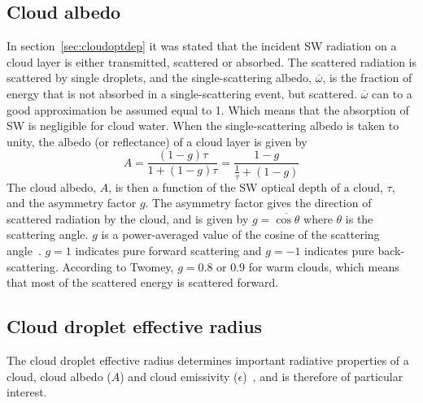 \subsection{Cloud albedo}
In section~\ref{sec:cloudoptdep} it was stated that the incident SW radiation on a cloud layer is either transmitted, scattered or absorbed. The scattered radiation is scattered by single droplets, and the single-scattering albedo, $\overline{\omega}$, is the fraction of energy that is not absorbed in a single-scattering event, but scattered. $\overline{\omega}$ can to a good approximation be assumed equal to 1. Which means that the absorption of SW is negligible for cloud water. When the single-scattering albedo is taken to unity, the albedo (or reflectance) of a cloud layer is given by~\citep{Hobbs1993}%
\begin{equation}
A = \frac{(1-g)\tau}{1+(1-g)\tau} = \frac{1-g}{\frac{1}{\tau}+(1-g)}
\label{eqn:cloudalbedo}
\end{equation}
The cloud albedo, $A$, is then a function of the SW optical depth of a cloud, $\tau$, and the asymmetry factor $g$. The asymmetry factor gives the direction of scattered radiation by the cloud, and is given by $g=\overline{\cos \theta}$ where $\theta$ is the scattering angle. $g$ is a power-averaged value of the cosine of the scattering angle~\citep{Twomey1974}. $g=1$ indicates pure forward scattering and $g=-1$ indicates pure back-scattering. According to Twomey, $g=0.8$ or $0.9$ for warm clouds, which means that most of the scattered energy is scattered forward.




\subsection{Cloud droplet effective radius}
\label{subsec:effectiveradius}
The cloud droplet effective radius determines important radiative properties of a cloud, cloud albedo ($A$) and cloud emissivity ($\epsilon$)~\citep{Hansen1974}, and is therefore of particular interest. 

